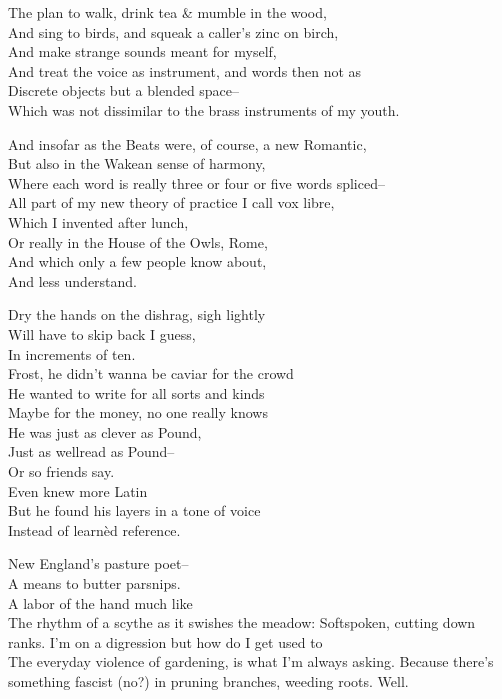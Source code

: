 The plan to walk, drink tea \& mumble in the wood, \\
And sing to birds, and squeak a caller's zinc on birch, \\
And make strange sounds meant for myself, \\
And treat the voice as instrument, and words then not as \\
Discrete objects but a blended space-- \\
Which was not dissimilar to the brass instruments of my youth.

And insofar as the Beats were, of course, a new Romantic, \\
But also in the Wakean sense of harmony, \\
Where each word is really three or four or five words spliced-- \\
All part of my new theory of practice I call vox libre, \\
Which I invented after lunch, \\
Or really in the House of the Owls, Rome, \\
And which only a few people know about, \\
And less understand.

Dry the hands on the dishrag, sigh lightly\\
Will have to skip back I guess, \\
In increments of ten. \\
Frost, he didn't wanna be caviar for the crowd \\
He wanted to write for all sorts and kinds \\
Maybe for the money, no one really knows \\
He was just as clever as Pound, \\
Just as wellread as Pound-- \\
Or so friends say. \\
Even knew more Latin \\
But he found his layers in a tone of voice \\
Instead of learnèd reference.

New England's pasture poet-- \\
A means to butter parsnips. \\
A labor of the hand much like \\
The rhythm of a scythe as it swishes the meadow:
Softspoken, cutting down ranks. I'm on a digression but how do I get used to \\
The everyday violence of gardening, is what I'm always asking. Because there's something fascist (no?) in pruning branches, weeding roots. Well.

